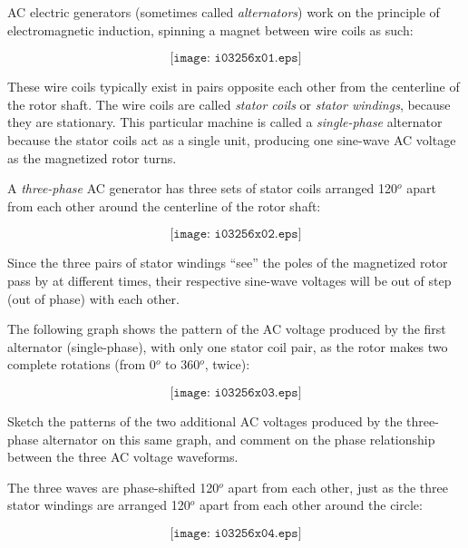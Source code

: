 

AC electric generators (sometimes called {\it alternators}) work on the principle of electromagnetic induction, spinning a magnet between wire coils as such:

$$\texttt{[image: i03256x01.eps]}$$

These wire coils typically exist in pairs opposite each other from the centerline of the rotor shaft.  The wire coils are called {\it stator coils} or {\it stator windings}, because they are stationary.  This particular machine is called a {\it single-phase} alternator because the stator coils act as a single unit, producing one sine-wave AC voltage as the magnetized rotor turns.

\vskip 10pt

A {\it three-phase} AC generator has three sets of stator coils arranged 120$^{o}$ apart from each other around the centerline of the rotor shaft:

$$\texttt{[image: i03256x02.eps]}$$

Since the three pairs of stator windings ``see'' the poles of the magnetized rotor pass by at different times, their respective sine-wave voltages will be out of step (out of phase) with each other.

\filbreak

The following graph shows the pattern of the AC voltage produced by the first alternator (single-phase), with only one stator coil pair, as the rotor makes two complete rotations (from 0$^{o}$ to 360$^{o}$, twice):

$$\texttt{[image: i03256x03.eps]}$$

Sketch the patterns of the two additional AC voltages produced by the three-phase alternator on this same graph, and comment on the phase relationship between the three AC voltage waveforms.







The three waves are phase-shifted 120$^{o}$ apart from each other, just as the three stator windings are arranged 120$^{o}$ apart from each other around the circle:

$$\texttt{[image: i03256x04.eps]}$$
 










